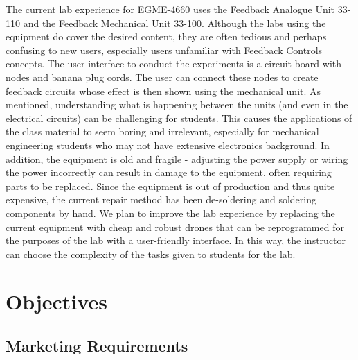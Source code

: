 \documentclass[12pt, titlepage]{article}
\begin{document}
The current lab experience for EGME-4660 uses the Feedback Analogue Unit 33-110 and the Feedback Mechanical Unit 33-100. Although the labs using the equipment do cover the desired content, they are often tedious and perhaps confusing to new users, especially users unfamiliar with Feedback Controls concepts. The user interface to conduct the experiments is a circuit board with nodes and banana plug cords. The user can connect these nodes to create feedback circuits whose effect is then shown using the mechanical unit. As mentioned, understanding what is happening between the units (and even in the electrical circuits) can be challenging for students. This causes the applications of the class material to  seem boring and irrelevant, especially for mechanical engineering students who may not have extensive electronics background. In addition, the equipment is old and fragile - adjusting the power supply or wiring the power incorrectly can result in damage to the equipment, often requiring parts to be replaced. Since the equipment is out of production and thus quite expensive, the current repair method has been de-soldering and soldering components by hand. We plan to improve the lab experience by replacing the current equipment with cheap and robust drones that can be reprogrammed for the purposes of the lab with a user-friendly interface. In this way, the instructor can choose the complexity of the tasks given to students for the lab.

\section{Objectives}
\subsection{Marketing Requirements}
\end{document}
